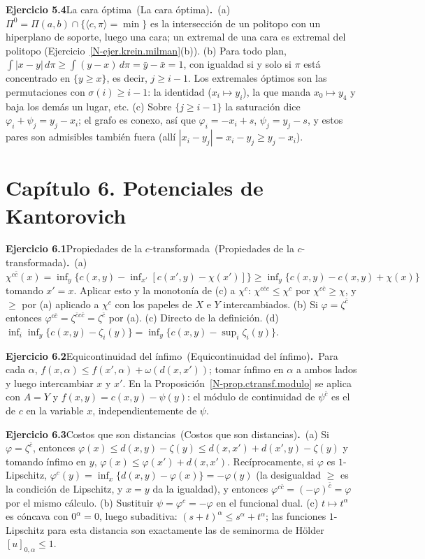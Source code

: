 \documentclass[11pt,a4paper]{amsart}
\theoremstyle{remark}
\theoremstyle{definition}
\numberwithin{subsection}{section}
\numberwithin{equation}{section}
\newcommand{\ejlabel}[2]{\par\medskip\noindent\textbf{Ejercicio #1}\ifx\relax#2\relax\else\ (#2)\fi\textbf{.}\ }
\begin{document}
\ejlabel{5.4}{La cara óptima}(a) $\Pi^0=\Pi(a,b)\cap\{\langle c,\pi\rangle=\min\}$ es la intersección de un politopo con un hiperplano de soporte, luego una cara; un extremal de una cara es extremal del politopo (Ejercicio~\ref{N-ejer.krein.milman}(b)). (b) Para todo plan, $\int|x-y|\,d\pi\ge\int(y-x)\,d\pi=\bar y-\bar x=1$, con igualdad si y solo si $\pi$ está concentrado en $\{y\ge x\}$, es decir, $j\ge i-1$. Los extremales óptimos son las permutaciones con $\sigma(i)\ge i-1$: la identidad ($x_i\mapsto y_i$), la que manda $x_0\mapsto y_4$ y baja los demás un lugar, etc. (c) Sobre $\{j\ge i-1\}$ la saturación dice $\varphi_i+\psi_j=y_j-x_i$; el grafo es conexo, así que $\varphi_i=-x_i+s$, $\psi_j=y_j-s$, y estos pares son admisibles también fuera (allí $|x_i-y_j|=x_i-y_j\ge y_j-x_i$).

\section*{Capítulo 6. Potenciales de Kantorovich}
\ejlabel{6.1}{Propiedades de la $c$-transformada}(a) $\chi^{c\bar c}(x)=\inf_y\{c(x,y)-\inf_{x'}[c(x',y)-\chi(x')]\}\ge\inf_y\{c(x,y)-c(x,y)+\chi(x)\}$ tomando $x'=x$. Aplicar esto y la monotonía de (c) a $\chi^c$: $\chi^{c\bar cc}\le\chi^c$ por $\chi^{c\bar c}\ge\chi$, y $\ge$ por (a) aplicado a $\chi^c$ con los papeles de $X$ e $Y$ intercambiados. (b) Si $\varphi=\zeta^{\bar c}$ entonces $\varphi^{c\bar c}=\zeta^{\bar cc\bar c}=\zeta^{\bar c}$ por (a). (c) Directo de la definición. (d) $\inf_i\inf_y\{c(x,y)-\zeta_i(y)\}=\inf_y\{c(x,y)-\sup_i\zeta_i(y)\}$.

\ejlabel{6.2}{Equicontinuidad del ínfimo}Para cada $\alpha$, $f(x,\alpha)\le f(x',\alpha)+\omega(d(x,x'))$; tomar ínfimo en $\alpha$ a ambos lados y luego intercambiar $x$ y $x'$. En la Proposición~\ref{N-prop.ctransf.modulo} se aplica con $A=Y$ y $f(x,y)=c(x,y)-\psi(y)$: el módulo de continuidad de $\psi^{\bar c}$ es el de $c$ en la variable $x$, independientemente de $\psi$.

\ejlabel{6.3}{Costos que son distancias}(a) Si $\varphi=\zeta^{\bar c}$, entonces $\varphi(x)\le d(x,y)-\zeta(y)\le d(x,x')+d(x',y)-\zeta(y)$ y tomando ínfimo en $y$, $\varphi(x)\le\varphi(x')+d(x,x')$. Recíprocamente, si $\varphi$ es $1$-Lipschitz, $\varphi^c(y)=\inf_x\{d(x,y)-\varphi(x)\}=-\varphi(y)$ (la desigualdad $\ge$ es la condición de Lipschitz, y $x=y$ da la igualdad), y entonces $\varphi^{c\bar c}=(-\varphi)^{\bar c}=\varphi$ por el mismo cálculo. (b) Sustituir $\psi=\varphi^c=-\varphi$ en el funcional dual. (c) $t\mapsto t^\alpha$ es cóncava con $0^\alpha=0$, luego subaditiva: $(s+t)^\alpha\le s^\alpha+t^\alpha$; las funciones $1$-Lipschitz para esta distancia son exactamente las de seminorma de Hölder $[u]_{0,\alpha}\le1$.
\end{document}
